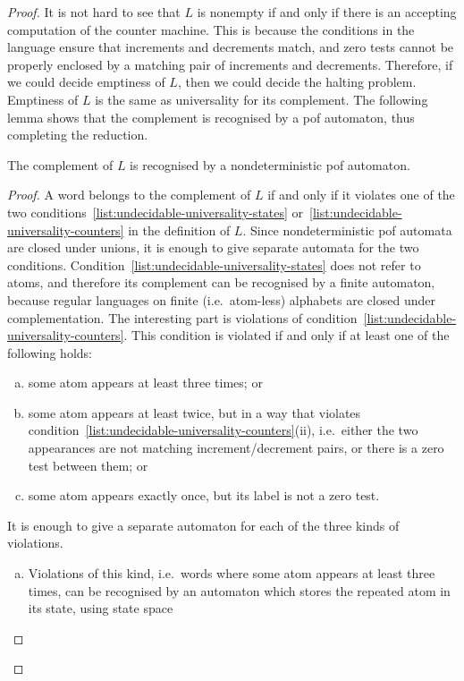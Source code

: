 \begin{proof}
It is not hard  to see that $L$ is nonempty if and only if there is an accepting computation of the counter machine. This is because the conditions in the language ensure that increments and decrements match, and zero tests cannot be properly enclosed by a matching pair of increments and decrements.
Therefore, if we could decide emptiness of $L$, then we could decide the halting problem. 
Emptiness of $L$ is the same as universality for its complement. The following lemma shows that the complement is recognised by a pof automaton, thus completing the reduction.
\begin{lemma}\label{lem:automaton-for-wrong-runs}
    The complement of $L$ is recognised by a nondeterministic pof automaton.
\end{lemma}
\begin{proof}
   A word belongs to the complement of $L$ if and only if it violates one of the two conditions~\ref{list:undecidable-universality-states} or~\ref{list:undecidable-universality-counters} in the definition of $L$. Since nondeterministic pof automata are closed under unions, it is enough to give separate automata for the two conditions. Condition~\ref{list:undecidable-universality-states} does not refer to atoms, and therefore its  complement can be recognised by a finite automaton, because regular languages on finite (i.e.~atom-less) alphabets are closed under complementation. The interesting part is violations of condition~\ref{list:undecidable-universality-counters}. This condition is violated if and only if at least one of the following holds: 
   \begin{enumerate}[(a)]
    \item \label{list:undecidability-error-a} some atom appears at least three times; or
    \item \label{list:undecidability-error-b} some atom appears at least twice, but in a way that violates condition~\ref{list:undecidable-universality-counters}(ii), i.e.~either the two appearances are not matching increment/decrement pairs, or there is a zero test between them; or 
    \item \label{list:undecidability-error-c} some atom appears exactly once, but its label is not a zero test.
   \end{enumerate}
   It is enough to give a separate automaton for each of the three kinds of violations. 
   \begin{enumerate}[(a)]
    \item Violations of this kind, i.e.~words where some atom appears at least three times, can be recognised by an automaton which stores the repeated atom in its state, using  state space 

\end{enumerate}
\end{proof}
\end{proof}
